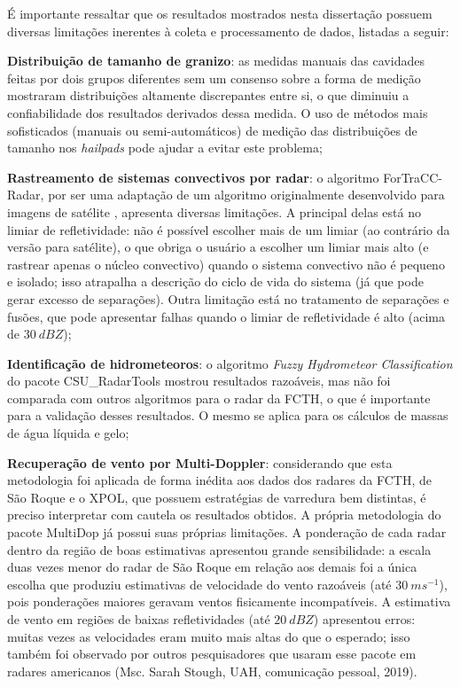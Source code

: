 É importante ressaltar que os resultados mostrados nesta dissertação possuem diversas limitações inerentes à coleta e processamento de dados, listadas a seguir:

\begin{alineas}
	\item \textbf{Distribuição de tamanho de granizo}: as medidas manuais das cavidades feitas por dois grupos diferentes sem um consenso sobre a forma de medição mostraram distribuições altamente discrepantes entre si, o que diminuiu a confiabilidade dos resultados derivados dessa medida. O uso de métodos mais sofisticados (manuais ou semi-automáticos) de medição das distribuições de tamanho nos \textit{hailpads} pode ajudar a evitar este problema;
	\item \textbf{Rastreamento de sistemas convectivos por radar}: o algoritmo ForTraCC-Radar, por ser uma adaptação de um algoritmo originalmente desenvolvido para imagens de satélite \cite{Vila2008}, apresenta diversas limitações. A principal delas está no limiar de refletividade: não é possível escolher mais de um limiar (ao contrário da versão para satélite), o que obriga o usuário a escolher um limiar mais alto (e rastrear apenas o núcleo convectivo) quando o sistema convectivo não é pequeno e isolado; isso atrapalha a descrição do ciclo de vida do sistema (já que pode gerar excesso de separações). Outra limitação está no tratamento de separações e fusões, que pode apresentar falhas quando o limiar de refletividade é alto (acima de $30\:dBZ$);
	\item \textbf{Identificação de hidrometeoros}: o algoritmo \textit{Fuzzy Hydrometeor Classification} do pacote CSU\_RadarTools \cite{Lang2017a} mostrou resultados razoáveis, mas não foi comparada com outros algoritmos para o radar da FCTH, o que é importante para a validação desses resultados. O mesmo se aplica para os cálculos de massas de água líquida e gelo;
	\item \textbf{Recuperação de vento por Multi-Doppler}: considerando que esta metodologia foi aplicada de forma inédita aos dados dos radares da FCTH, de São Roque e o XPOL, que possuem estratégias de varredura bem distintas, é preciso interpretar com cautela os resultados obtidos. A própria metodologia do pacote MultiDop já possui suas próprias limitações. A ponderação de cada radar dentro da região de boas estimativas apresentou grande sensibilidade: a escala duas vezes menor do radar de São Roque em relação aos demais foi a única escolha que produziu estimativas de velocidade do vento razoáveis (até $30\:ms^{-1}$), pois ponderações maiores geravam ventos fisicamente incompatíveis. A estimativa de vento em regiões de baixas refletividades (até $20\:dBZ$) apresentou erros: muitas vezes as velocidades eram muito mais altas do que o esperado; isso também foi observado por outros pesquisadores que usaram esse pacote em radares americanos (Msc. Sarah Stough, UAH, comunicação pessoal, 2019).
\end{alineas}

